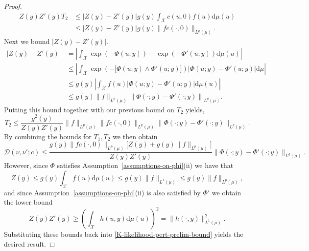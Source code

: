 \documentclass[final]{siamart171218}
\newcommand{\mcl}{\mathcal}
\newcommand{\dd}{\text{d}}
\newcommand{\mX}{\mcl{X}}
\newcommand{\K}{\mathcal{D}}
\begin{document}
\begin{proof}
\begin{equation*}
   \begin{aligned}
     Z(y) Z'(y) T_2
     & \le | Z(y) - Z'(y)|  g(y)  \int_\mX c(u, 0) f(u) \dd \mu(u) \\
     & \le | Z(y) - Z'(y)| g(y) \| f c(\cdot, 0) \|_{L^p(\mu)}.
 \end{aligned}
 \end{equation*}
 Next we bound $| Z(y)- Z'(y)|$.
 \begin{equation*}
   \begin{aligned}
   | Z(y) - Z'(y)| & = \left| \int_\mX \exp( - \Phi(u;y) ) 
     - \exp( - \Phi'(u;y) )  \dd \mu(u)
   \right| \\
   & \le \left| \int_\mX \exp \left( - \big[\Phi(u;y) \wedge \Phi'(u;y)  \big] \right)
       | \Phi(u;y) - \Phi'(u;y) | \dd \mu  \right| \\
   & \le g(y)   \left| \int_\mX f(u) |  \Phi(u;y)  - \Phi'(u;y) |  \dd \mu(u)
   \right| \\
   & \le g(y)  \| f \|_{L^p(\mu)} \left\|  \Phi(\cdot ;y)  - \Phi'(\cdot;y) \right\|_{L^q(\mu)}.
 \end{aligned}
\end{equation*}
Putting this bound together with our previous bound on $T_2$ yields,
\begin{equation*}
  T_2 \le \frac{g^2(y)}{Z(y) Z'(y)}  \| f\|_{L^p(\mu)} \| f c(\cdot, 0) \|_{L^p(\mu)}
  \| \Phi(\cdot; y) - \Phi'(\cdot; y) \|_{L^q(\mu)}.
\end{equation*}
By combining the bounds for $T_1, T_2$ we then obtain
\begin{equation}\label{K-likelihood-pert-prelim-bound}
  \K( \nu, \nu'; c)
  \le \frac{g(y) \| f c(\cdot, 0) \|_{L^p(\mu)} \Big[ Z(y) +  g(y) \| f \|_{L^p(\mu)}  \Big]}{Z(y) Z'(y)}
  \| \Phi(\cdot; y) - \Phi'(\cdot; y) \|_{L^q(\mu)}.
\end{equation}
However, since $\Phi$ satisfies  Assumption~\ref{assumptions-on-phi}(ii) we have that
\begin{equation}\label{upper-bound-on-Z-y}
  Z(y)  \le g(y)  \int_\mX  f(u)  \dd \mu(u) \le g(y) \| f\|_{L^1(\mu)} \le  g(y) \| f\|_{L^p(\mu)},
\end{equation}
and since Assumption~\ref{assumptions-on-phi}(ii) is also satisfied by $\Phi'$ we
obtain the lower bound 
\begin{equation*}
  Z(y) Z'(y) \ge
  \left( \int_\mX h(u,y) \dd \mu(u) \right)^2 = \| h(\cdot, y) \|_{L^1(\mu)}^2.
\end{equation*}
Substituting these bounds back into \eqref{K-likelihood-pert-prelim-bound} yields the desired
result.
{}
\end{proof}
\end{document}
